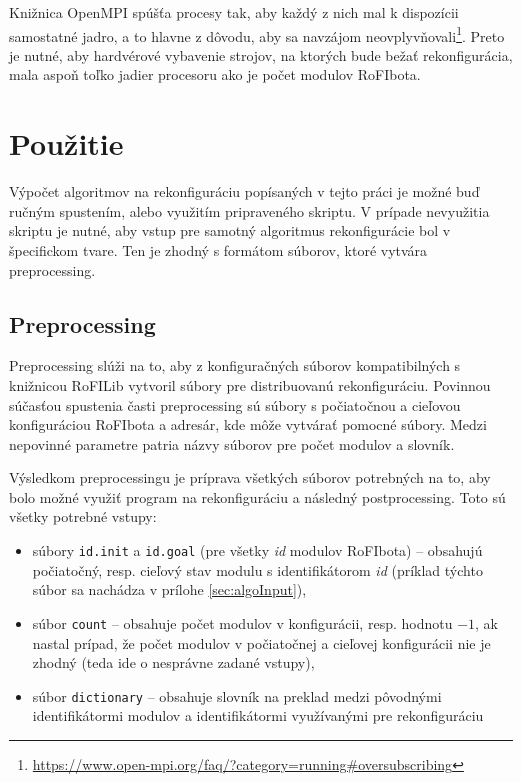 \documentclass[
  digital, %
  oneside, %
  notable,   %
  lof,     %
  nolot,     %
]{fithesis3}
\begin{document}
Knižnica OpenMPI spúšťa procesy tak, aby každý z nich mal k dispozícii samostatné jadro, a to hlavne z dôvodu, aby sa navzájom neovplyvňovali\footnote{\url{https://www.open-mpi.org/faq/?category=running\#oversubscribing}}. Preto je nutné, aby hardvérové vybavenie strojov, na ktorých bude bežať rekonfigurácia, mala aspoň toľko jadier procesoru ako je počet modulov RoFIbota. 

\section{Použitie}
Výpočet algoritmov na rekonfiguráciu popísaných v tejto práci je možné buď ručným spustením, alebo využitím pripraveného skriptu. V prípade nevyužitia skriptu je nutné, aby vstup pre samotný algoritmus rekonfigurácie bol v špecifickom tvare. Ten je zhodný s formátom súborov, ktoré vytvára preprocessing.

\subsection{Preprocessing}
Preprocessing slúži na to, aby z konfiguračných súborov kompatibilných s knižnicou RoFILib vytvoril súbory pre distribuovanú rekonfiguráciu. Povinnou súčasťou spustenia časti preprocessing sú súbory s počiatočnou a cieľovou konfiguráciou RoFIbota a adresár, kde môže vytvárať pomocné súbory. Medzi nepovinné parametre patria názvy súborov pre počet modulov a slovník. 

Výsledkom preprocessingu je príprava všetkých súborov potrebných na to, aby bolo možné využiť program na rekonfiguráciu a následný postprocessing. Toto sú všetky potrebné vstupy: 
\begin{itemize}
    \item súbory \texttt{id.init} a \texttt{id.goal} (pre všetky \textit{id} modulov RoFIbota) -- obsahujú počiatočný, resp. cieľový stav modulu s identifikátorom \textit{id} (príklad týchto súbor sa nachádza v prílohe \ref{sec:algoInput}), 
    \item súbor \texttt{count} -- obsahuje počet modulov v konfigurácii, resp. hodnotu $-1$, ak nastal prípad, že počet modulov v počiatočnej a cieľovej konfigurácii nie je zhodný (teda ide o nesprávne zadané vstupy), 
    \item súbor \texttt{dictionary} -- obsahuje slovník na preklad medzi pôvodnými identifikátormi modulov a identifikátormi využívanými pre rekonfiguráciu
\end{itemize}
\end{document}
